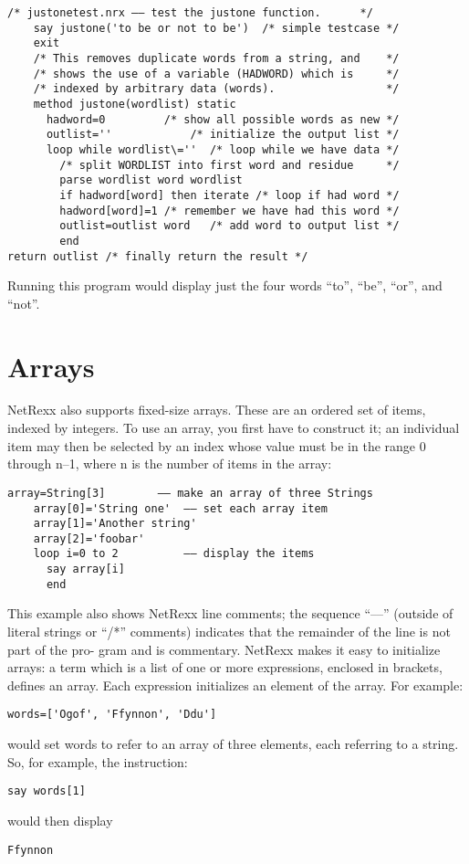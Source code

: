 \begin{lstlisting}[label=justone,caption=justonetest.nrx]
    /* justonetest.nrx –– test the justone function.      */
    say justone('to be or not to be')  /* simple testcase */
    exit
    /* This removes duplicate words from a string, and    */
    /* shows the use of a variable (HADWORD) which is     */
    /* indexed by arbitrary data (words).                 */
    method justone(wordlist) static
      hadword=0         /* show all possible words as new */
      outlist=''            /* initialize the output list */
      loop while wordlist\=''  /* loop while we have data */
        /* split WORDLIST into first word and residue     */
        parse wordlist word wordlist
        if hadword[word] then iterate /* loop if had word */
        hadword[word]=1 /* remember we have had this word */
        outlist=outlist word   /* add word to output list */
        end
return outlist /* finally return the result */
\end{lstlisting}
Running this program would display just the four words “to”, “be”, “or”, and “not”.
\section{Arrays}
NetRexx also supports fixed-size arrays. These are an ordered set of
items, indexed by integers. To use an array, you first have to
construct it; an individual item may then be selected by an index
whose value must be in the range 0 through n–1, where n is the number
of items in the array:
\begin{lstlisting}[label=arrays,caption=Arrays]
    array=String[3]        –– make an array of three Strings
    array[0]='String one'  –– set each array item
    array[1]='Another string'
    array[2]='foobar'
    loop i=0 to 2          –– display the items
      say array[i]
      end
\end{lstlisting}
This example also shows NetRexx line comments; the sequence “––” (outside of literal strings or “/*” comments) indicates that the remainder of the line is not part of the pro- gram and is commentary.
NetRexx makes it easy to initialize arrays: a term which is a list of
one or more expressions, enclosed in brackets, defines an array. Each
expression initializes an element of the array. For example:
\begin{lstlisting}[label=initializingelements,caption=Initializing elements]
words=['Ogof', 'Ffynnon', 'Ddu']
\end{lstlisting}
would set words to refer to an array of three elements, each referring to a string. So, for
example, the instruction:
\begin{lstlisting}[label=addresselement,caption=Address Element]
say words[1]
\end{lstlisting}
would then display 
\begin{verbatim}
Ffynnon
\end{verbatim}


